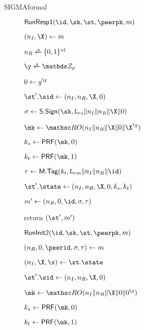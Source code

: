 \begin{collect*}{SIGMAformal}{}{}{}{}
\begin{figure}[tp]
\begin{minipage}[t]{0.49\textwidth}
		\ExptSepSpace
		
		\begin{algorithm}{$\RunRespI(\id,\sk,\st,\peerpk,m)$}
			\item $(\nonce_I,\X) \gets m$ 
			\item $\nonce_R \sample \bits^{\nl}$
			\item $\y \sample \ZZ_p$
			\item $\Y \gets g^{\y}$
			\item $\st'.\sid \gets (\nonce_I, \nonce_R,\X,\Y)$
			\item $\sigma \gets \SIGScheme.\SIGSign(\sk,\labelrs\|\nonce_I\|\nonce_R\|\X\|\Y)$
			\item $\mk \gets \RO(\nonce_I\|\nonce_R\|\X\|\Y\|\X^{\y})$
			\item $\ks \gets \PRF(\mk,0)$
			\item $\kt \gets \PRF(\mk,1)$
			\item {}
			\item $\tau \gets \MACScheme.\MACTag(\kt, \labelrm\|\nonce_I\|\nonce_R\|\id)$
			\item $\st'.\state \gets (\nonce_I,\nonce_R,\X,\Y,\ks,\kt)$ \newline
			\item $m' \gets (\nonce_R, \Y, \id, \sigma, \tau)$ \newline
			\item return $(\st', m')$
		\end{algorithm}
	\end{minipage}
	\begin{minipage}[t]{0.49\textwidth}
		\begin{algorithm}{$\RunInit(\id,\sk,\st,\peerpk,m)$}
			\item $(\nonce_R,\Y,\peerid,\sigma, \tau) \gets m$ \newline
			\item $(\nonce_I,\X,\x) \gets \st.\state$
			\item $\st'.\sid \gets (\nonce_I,\nonce_R,\X,\Y)$
			
			\item $\mk \gets \RO(\nonce_I\|\nonce_R\|\X\|\Y\|\Y^{\x})$
			\item $\ks \gets \PRF(\mk,0)$
			\item $\kt \gets \PRF(\mk,1)$
			\item {}
			

\end{algorithm}
\end{minipage}
\end{figure}
\end{collect*}
